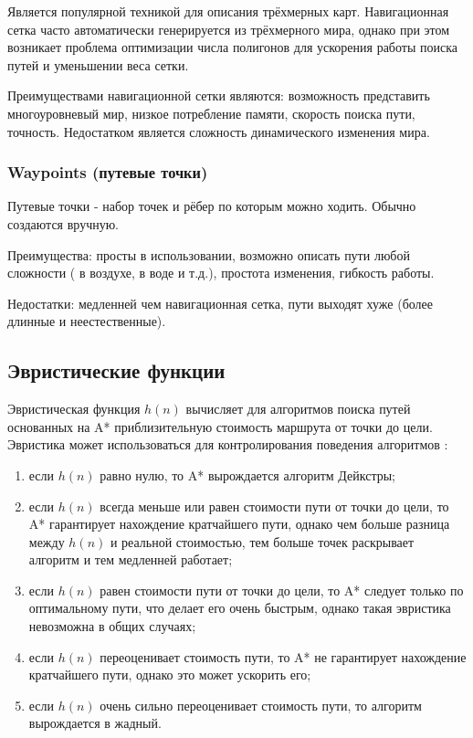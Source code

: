 Является популярной техникой для описания трёхмерных карт. Навигационная сетка часто автоматически генерируется из трёхмерного мира, однако при этом возникает проблема оптимизации числа полигонов для ускорения работы поиска путей и уменьшении веса сетки.

Преимуществами навигационной сетки являются: возможность представить многоуровневый мир, низкое потребление памяти, скорость поиска пути, точность. Недостатком является сложность динамического изменения мира.

\subsubsection{Waypoints (путевые точки)}

Путевые точки - набор точек и рёбер по которым можно ходить. Обычно создаются вручную.

Преимущества: просты в использовании, возможно описать пути любой сложности ( в воздухе, в воде и т.д.), простота изменения, гибкость работы.

Недостатки: медленней чем навигационная сетка, пути выходят хуже (более длинные и неестественные).

\subsection{Эвристические функции}

Эвристическая функция $h(n)$ вычисляет для алгоритмов поиска путей основанных на A* приблизительную стоимость маршрута от точки до цели. Эвристика может использоваться для контролирования поведения алгоритмов \cite{HEURISTICS}:

\begin{enumerate}
	\item если $h(n)$ равно нулю, то A* вырождается алгоритм Дейкстры;
	\item если $h(n)$ всегда меньше или равен стоимости пути от точки до цели, то A* гарантирует нахождение кратчайшего пути, однако чем больше разница между $h(n)$ и реальной стоимостью, тем больше точек раскрывает алгоритм и тем медленней работает;
	\item если $h(n)$ равен стоимости пути от точки до цели, то A* следует только по оптимальному пути, что делает его очень быстрым, однако такая эвристика невозможна в общих случаях;
	\item если $h(n)$ переоценивает стоимость пути, то A* не гарантирует нахождение кратчайшего пути, однако это может ускорить его;
	\item если $h(n)$ очень сильно переоценивает стоимость пути, то алгоритм вырождается в жадный.
\end{enumerate}

